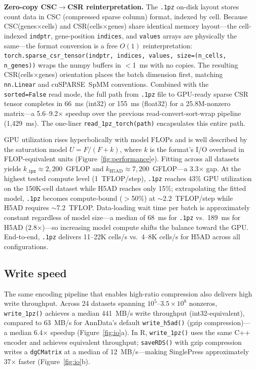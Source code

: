 \documentclass[10pt,twocolumn,letterpaper]{article}
\begin{document}
\textbf{Zero-copy CSC$\to$CSR reinterpretation.}
The \texttt{.1pz} on-disk layout stores count data in CSC (compressed sparse column) format, indexed by cell.
Because CSC(genes$\times$cells) and CSR(cells$\times$genes) share identical memory layout---the cell-indexed \texttt{indptr}, gene-position \texttt{indices}, and \texttt{values} arrays are physically the same---the format conversion is a free $O(1)$ reinterpretation: \texttt{torch.sparse\_csr\_tensor(indptr, indices, values, size=(n\_cells, n\_genes))} wraps the numpy buffers in $<$1~ms with no copies.
The resulting CSR(cells$\times$genes) orientation places the batch dimension first, matching \texttt{nn.Linear} and cuSPARSE~SpMM conventions.
Combined with the \texttt{sorted=False} read mode, the full path from \texttt{.1pz} file to GPU-ready sparse CSR tensor completes in 66~ms (int32) or 155~ms (float32) for a 25.8M-nonzero matrix---a 5.6--9.2$\times$ speedup over the previous read-convert-sort-wrap pipeline (1{,}429~ms).
The one-liner \texttt{read\_1pz\_torch(path)} encapsulates this entire path.

GPU utilization rises hyperbolically with model FLOPs and is well described by the saturation model $U = F / (F + k)$, where $k$ is the format's I/O overhead in FLOP-equivalent units (Figure~\ref{fig:performance}e).
Fitting across all datasets yields $k_{\texttt{.1pz}} \approx 2{,}200$~GFLOP and $k_{\text{H5AD}} \approx 7{,}200$~GFLOP---a 3.3$\times$ gap.
At the highest tested compute level (1~TFLOP/step), \texttt{.1pz} reaches 43\% GPU utilization on the 150K-cell dataset while H5AD reaches only 15\%; extrapolating the fitted model, \texttt{.1pz} becomes compute-bound ($>$50\%) at $\sim$2.2~TFLOP/step while H5AD requires $\sim$7.2~TFLOP.
Data-loading wait time per batch is approximately constant regardless of model size---a median of 68~ms for \texttt{.1pz} vs.\ 189~ms for H5AD (2.8$\times$)---so increasing model compute shifts the balance toward the GPU.
End-to-end, \texttt{.1pz} delivers 11--22K cells/s vs.\ 4--8K cells/s for H5AD across all configurations.

\subsection{Write speed}

The same encoding pipeline that enables high-ratio compression also delivers high write throughput.
Across 24 datasets spanning $10^5$--$3.5 \times 10^8$ nonzeros, \texttt{write\_1pz()} achieves a median 441~MB/s write throughput (int32-equivalent), compared to 63~MB/s for AnnData's default \texttt{write\_h5ad()} (gzip compression)---a median 6.4$\times$ speedup (Figure~\ref{fig:io}a).
In R, \texttt{write\_1pz()} uses the same C++ encoder and achieves equivalent throughput; \texttt{saveRDS()} with gzip compression writes a \texttt{dgCMatrix} at a median of 12~MB/s---making SinglePress approximately 37$\times$ faster (Figure~\ref{fig:io}b).
\end{document}
